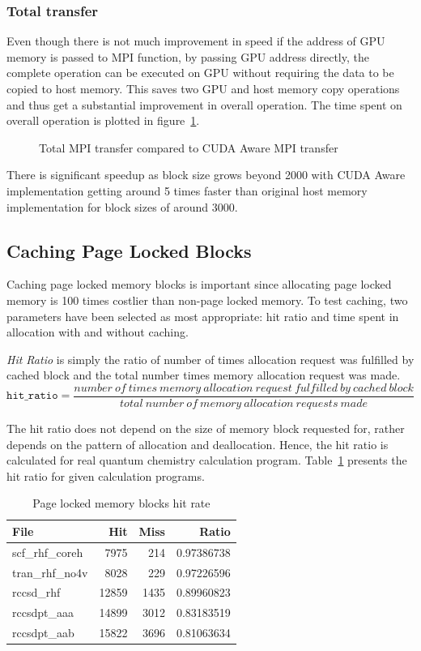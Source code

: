 \subsubsection{Total transfer}
Even though there is not much improvement in speed if the address of GPU memory is
passed to MPI function, by passing GPU address directly, the complete operation
can be executed on GPU without requiring the data to be copied to host memory. This
saves two GPU and host memory copy operations and thus get a substantial improvement
in overall operation. The time spent on overall operation is plotted in
figure~\ref{fig:mempin_rdma_total}.

\begin{figure}[h]
  
  \caption{Total MPI transfer compared to CUDA Aware MPI transfer}
  \label{fig:mempin_rdma_total}
\end{figure}

There is significant speedup as block size grows beyond 2000 with CUDA Aware
implementation getting around 5 times faster than original host memory implementation
for block sizes of around 3000.

\subsection{Caching Page Locked Blocks}
Caching page locked memory blocks is important since allocating page locked memory
is 100 times costlier than non-page locked memory. To test caching, two parameters
have been selected as most appropriate: hit ratio and time spent in allocation with
and without caching.

\textit{Hit Ratio} is simply the ratio of number of times allocation request was
fulfilled by cached block and the total number times memory allocation request
was made.
\[
  \texttt{hit\_ratio} = \frac{number~of~times~memory~allocation~request~fulfilled~by~cached~block}{total~number~of~memory~allocation~requests~made}
\]

The hit ratio does not depend on the size of memory block requested for, rather
depends on the pattern of allocation and deallocation. Hence, the hit ratio is calculated
for real quantum chemistry calculation program. Table~\ref{tab:mempin_hitrate}
presents the hit ratio for given calculation programs.

\begin{table}[h]
  \centering
  \caption{Page locked memory blocks hit rate}
  \begin{tabular}{l r r r}
    \hline
    File            & Hit   & Miss & Ratio      \\
    \hline
    scf\_rhf\_coreh &  7975 &  214 & 0.97386738 \\
    tran\_rhf\_no4v &  8028 &  229 & 0.97226596 \\
    rccsd\_rhf      & 12859 & 1435 & 0.89960823 \\
    rccsdpt\_aaa    & 14899 & 3012 & 0.83183519 \\
    rccsdpt\_aab    & 15822 & 3696 & 0.81063634 \\
    \hline
  \end{tabular}
  \label{tab:mempin_hitrate}
\end{table}

